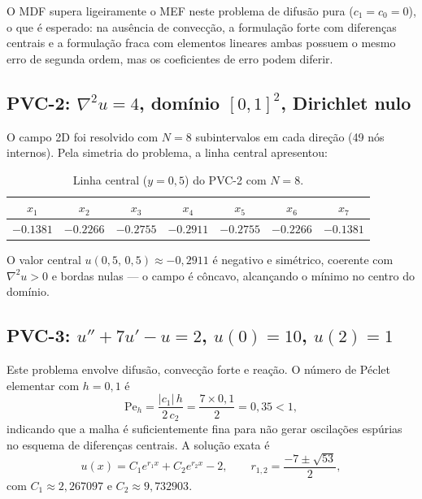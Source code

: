 \documentclass[12pt,a4paper]{article}
\begin{document}
O MDF supera ligeiramente o MEF neste problema de difusão pura ($c_1=c_0=0$), o que é esperado: na ausência de convecção, a formulação forte com diferenças centrais e a formulação fraca com elementos lineares ambas possuem o mesmo erro de segunda ordem, mas os coeficientes de erro podem diferir.

\subsection{PVC-2: $\nabla^2 u = 4$, domínio $[0,1]^2$, Dirichlet nulo}
O campo 2D foi resolvido com $N=8$ subintervalos em cada direção (49 nós internos). Pela simetria do problema, a linha central apresentou:

\begin{table}[H]
\centering
\begin{tabular}{ccccccc}
\toprule
$x_1$ & $x_2$ & $x_3$ & $x_4$ & $x_5$ & $x_6$ & $x_7$ \\
\midrule
$-0.1381$ & $-0.2266$ & $-0.2755$ & $-0.2911$ & $-0.2755$ & $-0.2266$ & $-0.1381$ \\
\bottomrule
\end{tabular}
\caption{Linha central ($y=0{,}5$) do PVC-2 com $N=8$.}
\end{table}

O valor central $u(0{,}5,\,0{,}5)\approx-0{,}2911$ é negativo e simétrico, coerente com $\nabla^2 u > 0$ e bordas nulas — o campo é côncavo, alcançando o mínimo no centro do domínio.

\subsection{PVC-3: $u''+7u'-u=2$, $u(0)=10$, $u(2)=1$}
Este problema envolve difusão, convecção forte e reação. O número de Péclet elementar com $h=0{,}1$ é
\begin{equation}
    \mathrm{Pe}_h = \frac{|c_1|\,h}{2\,c_2} = \frac{7\times0{,}1}{2} = 0{,}35 < 1,
\end{equation}
indicando que a malha é suficientemente fina para não gerar oscilações espúrias no esquema de diferenças centrais. A solução exata é
\begin{equation}
    u(x) = C_1 e^{r_1 x} + C_2 e^{r_2 x} - 2, \qquad r_{1,2}=\frac{-7\pm\sqrt{53}}{2},
\end{equation}
com $C_1\approx2{,}267097$ e $C_2\approx9{,}732903$.
\end{document}
